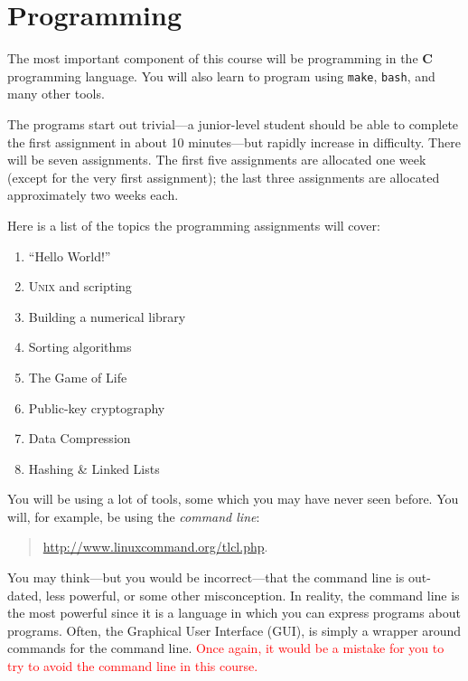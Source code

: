\documentclass[12pt]{article}
\begin{document}
\section{Programming}

The most important component of this course will be programming in the
\textbf{C} programming language. You will also learn to program using
\texttt{make}, \texttt{bash}, and many other tools.

The programs start out trivial---a junior-level student should be able
to complete the first assignment in about 10 minutes---but rapidly
increase in difficulty. There will be seven assignments. The first five
assignments are allocated one week (except for the very first
assignment); the last three assignments are allocated approximately two
weeks each.

Here is a list of the topics the programming assignments will cover:

\begin{adjmulticols}{2}{\oddsidemargin}{\oddsidemargin}
\begin{enumerate}[start=0]
  \item ``Hello World!''
  \item \textsc{Unix} and scripting
  \item Building a numerical library
  \item Sorting algorithms
  \item The Game of Life
  \item Public-key cryptography
  \item Data Compression
  \item Hashing \& Linked Lists
\end{enumerate}
\end{adjmulticols}

You will be using a lot of tools, some which you may have never seen before. You
will, for example, be using the \emph{command line}:
\begin{quotation}
\centerline{\url{http://www.linuxcommand.org/tlcl.php}.}
\end{quotation}
You may think---but you would be incorrect---that the command line is out-dated,
less powerful, or some other misconception. In reality, the command line is the
most powerful since it is a language in which you can express programs about
programs. Often, the Graphical User Interface (GUI), is simply a wrapper around
commands for the command line. \textcolor{red}{Once again, it would be a
mistake for you to try to avoid the command line in this course.}
\end{document}
